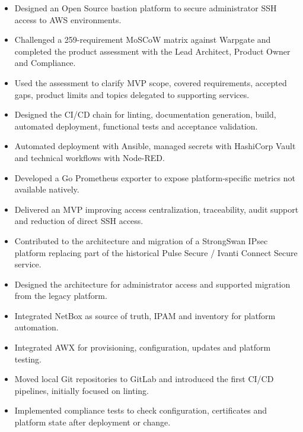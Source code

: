 
\begin{itemize}
  \item Designed an Open Source bastion platform to secure administrator SSH access to AWS environments.
  \item Challenged a 259-requirement MoSCoW matrix against Warpgate and completed the product assessment with the Lead Architect, Product Owner and Compliance.
  \item Used the assessment to clarify MVP scope, covered requirements, accepted gaps, product limits and topics delegated to supporting services.
  \item Designed the CI/CD chain for linting, documentation generation, build, automated deployment, functional tests and acceptance validation.
  \item Automated deployment with Ansible, managed secrets with HashiCorp Vault and technical workflows with Node-RED.
  \item Developed a Go Prometheus exporter to expose platform-specific metrics not available natively.
  \item Delivered an MVP improving access centralization, traceability, audit support and reduction of direct SSH access.
\end{itemize}

\begin{itemize}
  \item Contributed to the architecture and migration of a StrongSwan IPsec platform replacing part of the historical Pulse Secure / Ivanti Connect Secure service.
  \item Designed the architecture for administrator access and supported migration from the legacy platform.
  \item Integrated NetBox as source of truth, IPAM and inventory for platform automation.
  \item Integrated AWX for provisioning, configuration, updates and platform testing.
  \item Moved local Git repositories to GitLab and introduced the first CI/CD pipelines, initially focused on linting.
  \item Implemented compliance tests to check configuration, certificates and platform state after deployment or change.
\end{itemize}

